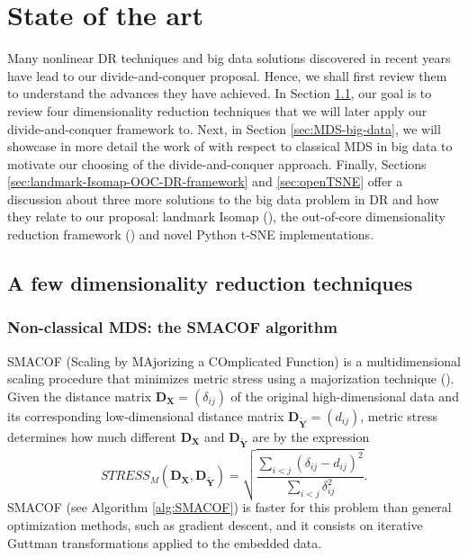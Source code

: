 \section{State of the art}

Many nonlinear DR techniques and big data solutions discovered in recent years have lead to our divide-and-conquer proposal. Hence, we shall first review them to understand the advances they have achieved. In Section \ref{sec:DR-techniques}, our goal is to review four dimensionality reduction techniques that we will later apply our divide-and-conquer framework to. Next, in Section \ref{sec:MDS-big-data}, we will showcase in more detail the work of \citet{Delicado2024} with respect to classical MDS in big data to motivate our choosing of the divide-and-conquer approach. Finally, Sections \ref{sec:landmark-Isomap-OOC-DR-framework} and \ref{sec:openTSNE} offer a discussion about three more solutions to the big data problem in DR and how they relate to our proposal: landmark Isomap (\cite{Silva2002}), the out-of-core dimensionality reduction framework (\cite{Reichmann2024}) and novel Python t-SNE implementations.

\subsection{A few dimensionality reduction techniques}
\label{sec:DR-techniques}

\subsubsection{Non-classical MDS: the SMACOF algorithm}

SMACOF (Scaling by MAjorizing a COmplicated Function) is a multidimensional scaling procedure that minimizes metric stress using a majorization technique (\cite{Kruskal1964a,Kruskal1964b}). Given the distance matrix $\mathbf{D}_{\mathbf{X}} = (\delta_{ij})$ of the original high-dimensional data and its corresponding low-dimensional distance matrix $\mathbf{D}_{\mathbf{\tilde{Y}}} = (d_{ij})$, metric stress determines how much different $\mathbf{D}_{\mathbf{X}}$ and $\mathbf{D}_{\mathbf{\tilde{Y}}}$ are by the expression
$$
STRESS_M(\mathbf{D}_{\mathbf{X}}, \mathbf{D}_{\mathbf{\tilde{Y}}}) = \sqrt{\frac{\sum_{i<j}\left(\delta_{i j}-d_{i j}\right)^2}{\sum_{i<j} \delta_{i j}^2}}.
$$
SMACOF (see Algorithm \ref{alg:SMACOF}) is faster for this problem than general optimization methods, such as gradient descent, and it consists on iterative Guttman transformations \citep{Guttman1968} applied to the embedded data.

